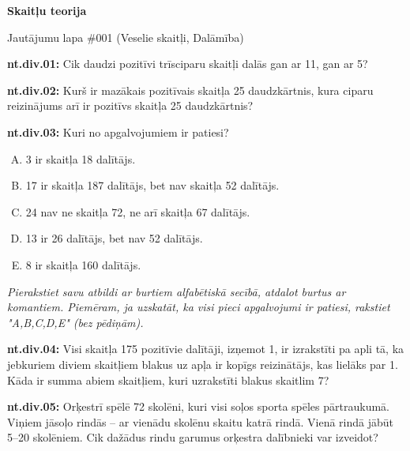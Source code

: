 \documentclass[11pt]{article}
\newenvironment{uzdevums}[1][\unskip]{%
\vspace{3mm}
\noindent
\textbf{#1:}
\noindent}
{}
\begin{document}
\begin{center}
{\LARGE \bf Skaitļu teorija}
\end{center}

\begin{center}
{\large Jautājumu lapa \#001 (Veselie skaitļi, Dalāmība)}
\end{center}


\begin{uzdevums}[nt.div.01]
Cik daudzi pozitīvi trīsciparu skaitļi dalās gan ar 11, gan ar 5? 
\end{uzdevums}


\begin{uzdevums}[nt.div.02]
Kurš ir mazākais pozitīvais skaitļa 25 daudzkārtnis, kura ciparu reizinājums arī ir pozitīvs skaitļa 25 daudzkārtnis?
\end{uzdevums}


\begin{uzdevums}[nt.div.03]
Kuri no apgalvojumiem ir patiesi?
\begin{enumerate}[A.]
\item 3 ir skaitļa 18 dalītājs.
\item 17 ir skaitļa 187 dalītājs, bet nav skaitļa 52 dalītājs.
\item 24 nav ne skaitļa 72, ne arī skaitļa 67 dalītājs.
\item 13 ir 26 dalītājs, bet nav 52 dalītājs. 
\item 8 ir skaitļa 160 dalītājs.
\end{enumerate}
{\em  Pierakstiet savu atbildi ar burtiem alfabētiskā secībā, atdalot burtus ar komantiem. Piemēram, ja uzskatāt, ka visi pieci apgalvojumi ir patiesi, rakstiet "A,B,C,D,E" (bez pēdiņām).}
\end{uzdevums}


\begin{uzdevums}[nt.div.04]
Visi skaitļa 175 pozitīvie dalītāji, izņemot 1, ir izrakstīti pa apli tā, ka jebkuriem diviem skaitļiem 
blakus uz apļa ir kopīgs reizinātājs, 
kas lielāks par 1. Kāda ir summa abiem skaitļiem, kuri uzrakstīti blakus skaitlim 7?
\end{uzdevums}



\begin{uzdevums}[nt.div.05]
Orķestrī spēlē 72 skolēni, kuri visi soļos sporta spēles pārtraukumā. Viņiem jāsoļo rindās -- ar vienādu skolēnu skaitu katrā rindā. 
Vienā rindā jābūt 5--20 skolēniem. Cik dažādus rindu garumus orķestra dalībnieki var izveidot?
\end{uzdevums}
\end{document}

